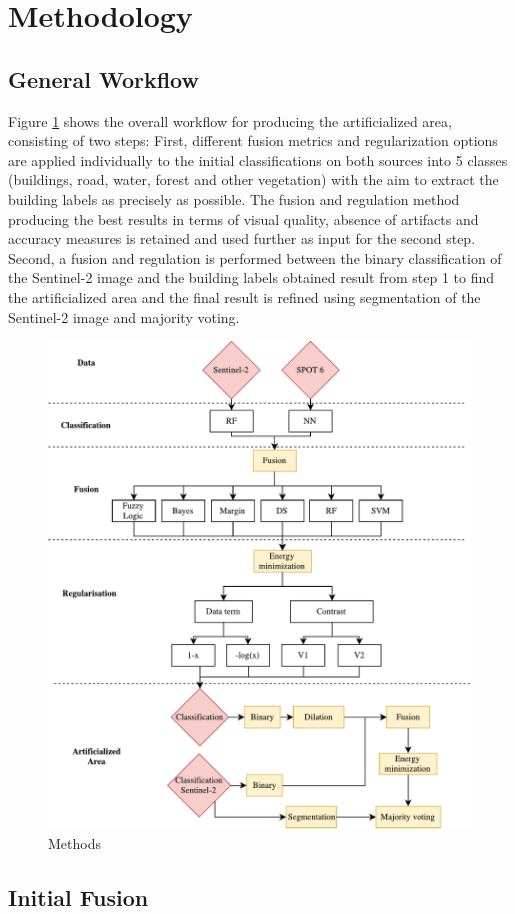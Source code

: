 \documentclass[10pt]{article}
\begin{document}
\section{Methodology}\label{sec:method}
\subsection{General Workflow}
Figure \ref{fig:methods} shows the overall workflow for producing the artificialized area, consisting of two steps: First, different fusion metrics and regularization options are applied individually to the initial classifications on both sources into 5 classes (buildings, road, water, forest and other vegetation) with the aim to extract the building labels as precisely as possible. The fusion and regulation method producing the best results in terms of visual quality, absence of artifacts and accuracy measures is retained and used further as input for the second step. Second, a fusion and regulation is performed between the binary classification of the Sentinel-2 image and the building labels obtained result from step 1 to find the artificialized area and the final result is refined using segmentation of the Sentinel-2 image and majority voting.

\begin{figure}[H]
    \centering
    \includegraphics[width=.7\textwidth]{IGN-methods}
    \caption{Methods}
    \label{fig:methods}
\end{figure}

\subsection{Initial Fusion}
\end{document}
